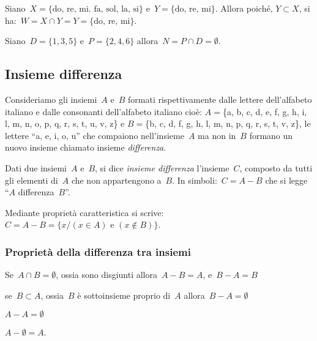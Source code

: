  \begin{esempio}
Siano~\(X=\{\text{do, re, mi. fa, sol, la, si}\}\)
e~\(Y=\{\text{do, re, mi}\}\). Allora poiché, 
\(Y\subset X\), si ha:~\(W=X\cap Y=Y=\{\text{do, re, mi}\}\).
 \end{esempio}

 \begin{esempio}
Siano~\(D=\{1,3,5\}\) e~\(P=\{2,4,6\}\) allora~\(N=P\cap D=\emptyset\).
\begin{center}
 
\end{center}
 \end{esempio}


\subsection{Insieme differenza}
\label{subsec:op_differenza}

Consideriamo gli insiemi~\(A\) e~\(B\) formati rispettivamente
dalle lettere dell'alfabeto italiano e dalle
consonanti dell'alfabeto italiano cioè:
\(A=\)\{a, b, c, d, e, f, g, h, i, l, m, n, o, p, q, r, s, t, u, v, z\} e
\(B=\)\{b, c, d, f, g, h, l, m, n, p, q, r, s, t, v, z\}, le lettere 
``a, e, i, o, u'' che compaiono nell'insieme~\(A\) ma non in~\(B\) formano 
un 
nuovo insieme chiamato insieme \emph{differenza}.

\begin{definizione}
 Dati due insiemi~\(A\) e~\(B\), si dice \emph{insieme differenza} 
 l'insieme~\(C\), 
 composto da tutti gli elementi di~\(A\) che non appartengono a~\(B\). 
 In simboli:~\(C=A-B\) che si legge ``\(A\) differenza~\(B\)''.
\end{definizione}

\begin{center}

\end{center}
Mediante proprietà caratteristica si 
scrive:~\(C=A-B=\{x/(x\in A)\text{ e }(x\notin B)\}\).

\subsubsection{Proprietà della differenza tra insiemi}

\begin{enumeratea}
\item Se~\(A\cap B=\emptyset \), ossia sono disgiunti 
allora~\(A-B=A\), e~\(B-A=B\)
\item se~\(B\subset A\), ossia~\(B\) è sottoinsieme proprio 
 di~\(A\) allora~\(B-A=\emptyset \)
\item \(A-A=\emptyset\)
\item \(A-\emptyset =A\).
\end{enumeratea}

